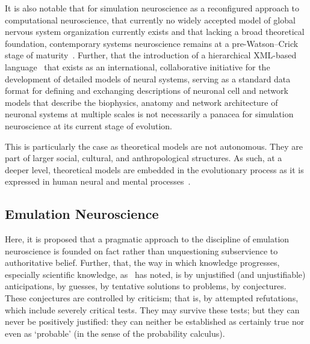 \documentclass[11pt,3p,twocolumn]{JMN}
\begin{document}
It is also notable that for simulation neuroscience as a reconfigured approach to computational neuroscience, that currently no widely accepted model of global nervous system organization currently exists and that lacking a broad theoretical foundation, contemporary systems neuroscience remains at a pre-Watson–Crick stage of maturity~\citep{swanson10}. Further, that the introduction of a hierarchical XML-based language~\citep{} that exists as an international, collaborative initiative for the development of detailed models of neural systems, serving as a standard data format for defining and exchanging descriptions of neuronal cell and network models that describe the biophysics, anatomy and network architecture of neuronal systems at multiple scales is not necessarily a panacea for simulation neuroscience at its current stage of evolution.

This is particularly the case as theoretical models are not autonomous. They are part of larger social, cultural, and anthropological structures. As such, at a deeper level, theoretical models are embedded in the evolutionary process as it is expressed in human neural and mental processes~\citep{jacobson93}.

\subsection{Emulation Neuroscience}
\label{subsection:emuneuro}


Here, it is proposed that a pragmatic approach to the discipline of emulation neuroscience is founded on fact rather than unquestioning subservience to authoritative belief. Further, that, the way in which knowledge progresses, especially scientific knowledge, as~\citet{popper62} has noted, is by unjustified (and unjustifiable) anticipations, by guesses, by tentative solutions to problems, by conjectures. These conjectures are controlled by criticism; that is, by attempted refutations, which include severely critical tests. They may survive these tests; but they can never be positively justified: they can neither be established as certainly true nor even as `probable' (in the sense of the probability calculus).
\end{document}
